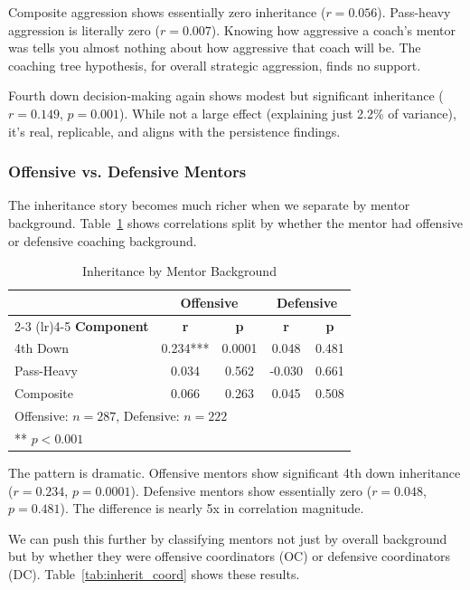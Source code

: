 \documentclass[11pt,twocolumn]{article}
\begin{document}
Composite aggression shows essentially zero inheritance ($r=0.056$). Pass-heavy aggression is literally zero ($r=0.007$). Knowing how aggressive a coach's mentor was tells you almost nothing about how aggressive that coach will be. The coaching tree hypothesis, for overall strategic aggression, finds no support.

Fourth down decision-making again shows modest but significant inheritance ($r=0.149$, $p=0.001$). While not a large effect (explaining just 2.2\% of variance), it's real, replicable, and aligns with the persistence findings.

\subsubsection{Offensive vs. Defensive Mentors}

The inheritance story becomes much richer when we separate by mentor background. Table~\ref{tab:inherit_type} shows correlations split by whether the mentor had offensive or defensive coaching background.

\begin{table}[H]
\centering
\caption{Inheritance by Mentor Background}
\label{tab:inherit_type}
\scriptsize
\begin{tabular}{lcccc}
\toprule
 & \multicolumn{2}{c}{\textbf{Offensive}} & \multicolumn{2}{c}{\textbf{Defensive}} \\
\cmidrule(lr){2-3} \cmidrule(lr){4-5}
\textbf{Component} & \textbf{r} & \textbf{p} & \textbf{r} & \textbf{p} \\
\midrule
4th Down & 0.234*** & 0.0001 & 0.048 & 0.481 \\
Pass-Heavy & 0.034 & 0.562 & -0.030 & 0.661 \\
Composite & 0.066 & 0.263 & 0.045 & 0.508 \\
\bottomrule
\multicolumn{5}{l}{\small Offensive: $n=287$, Defensive: $n=222$}\\
\multicolumn{5}{l}{\small *** $p<0.001$}
\end{tabular}
\end{table}

The pattern is dramatic. Offensive mentors show significant 4th down inheritance ($r=0.234$, $p=0.0001$). Defensive mentors show essentially zero ($r=0.048$, $p=0.481$). The difference is nearly 5x in correlation magnitude.

We can push this further by classifying mentors not just by overall background but by whether they were offensive coordinators (OC) or defensive coordinators (DC). Table~\ref{tab:inherit_coord} shows these results.
\end{document}
